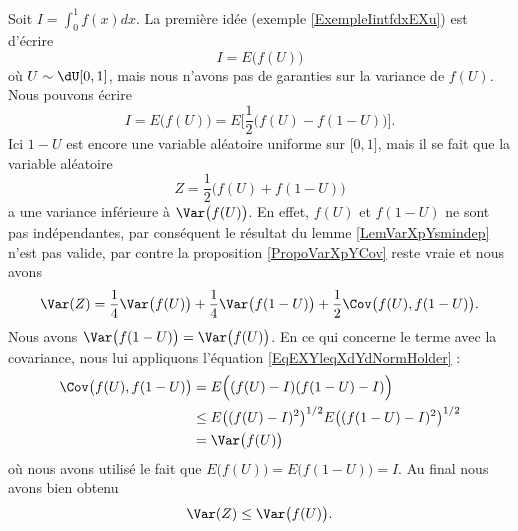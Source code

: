 Soit \( I=\int_0^1f(x)dx\). La première idée (exemple \ref{ExempleIintfdxEXu}) est d'écrire 
\begin{equation}
    I=E\big( f(U) \big)
\end{equation}
où \( U\sim\dU\mathopen[ 0 , 1 \mathclose]\), mais nous n'avons pas de garanties sur la variance de \( f(U)\). Nous pouvons écrire
\begin{equation}
    I=E\big( f(U) \big)=E\Big[ \frac{ 1 }{2}\big( f(U)-f(1-U) \big) \Big].
\end{equation}
Ici \( 1-U\) est encore une variable aléatoire uniforme sur \( \mathopen[ 0 , 1 \mathclose]\), mais il se fait que la variable aléatoire
\begin{equation}
    Z=\frac{ 1 }{2}\big( f(U)+f(1-U) \big)
\end{equation}
a une variance inférieure à \( \Var\big( f(U) \big)\). En effet, \( f(U)\) et \( f(1-U)\) ne sont pas indépendantes, par conséquent le résultat du lemme \ref{LemVarXpYsmindep} n'est pas valide, par contre la proposition \ref{PropoVarXpYCov} reste vraie et nous avons
\begin{equation}
    \Var(Z)=\frac{1}{ 4 }\Var\big( f(U) \big)+\frac{1}{ 4 }\Var\big( f(1-U) \big)+\frac{ 1 }{2}\Cov\big( f(U),f(1-U) \big).
\end{equation}
Nous avons \( \Var\big( f(1-U) \big)=\Var\big( f(U) \big)\). En ce qui concerne le terme avec la covariance, nous lui appliquons l'équation \eqref{EqEXYleqXdYdNormHolder} :
\begin{subequations}
    \begin{align}
        \Cov\big( f(U),f(1-U) \big)&=E\Big( (f(U)-I)(f(1-U)-I) \Big)\\
        &\leq E\big( (f(U)-I)^2 \big)^{1/2}E\big( (f(1-U)-I)^2 \big)^{1/2}\\
        &=\Var\big( f(U) \big)
    \end{align}
\end{subequations}
où nous avons utilisé le fait que \( E\big( f(U) \big)=E\big( f(1-U) \big)=I\). Au final nous avons bien obtenu
\begin{equation}
    \Var(Z)\leq \Var\big( f(U) \big).
\end{equation}

